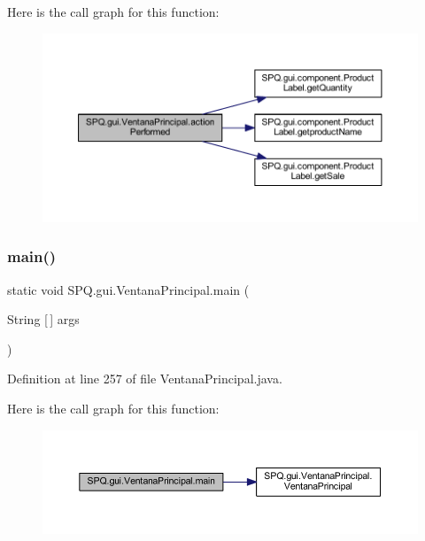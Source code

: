 Here is the call graph for this function\+:\nopagebreak
\begin{figure}[H]
\begin{center}
\leavevmode
\includegraphics[width=350pt]{class_s_p_q_1_1gui_1_1_ventana_principal_a8cb181f9dff7128cd674383688ca2c56_cgraph}
\end{center}
\end{figure}
\mbox{\label{class_s_p_q_1_1gui_1_1_ventana_principal_a48fb869f7efb018079dac708ed20f7d3}} 
\subsubsection{\texorpdfstring{main()}{main()}}
{\footnotesize\ttfamily static void S\+P\+Q.\+gui.\+Ventana\+Principal.\+main (\begin{DoxyParamCaption}\item[{String \mbox{[}$\,$\mbox{]}}]{args }\end{DoxyParamCaption})\hspace{0.3cm}{\ttfamily [static]}}



Definition at line 257 of file Ventana\+Principal.\+java.

Here is the call graph for this function\+:\nopagebreak
\begin{figure}[H]
\begin{center}
\leavevmode
\includegraphics[width=350pt]{class_s_p_q_1_1gui_1_1_ventana_principal_a48fb869f7efb018079dac708ed20f7d3_cgraph}
\end{center}
\end{figure}


